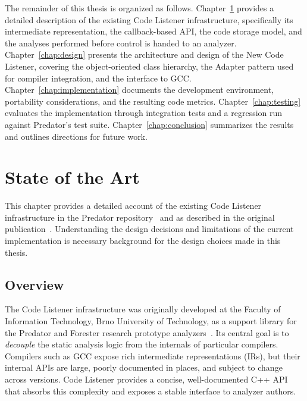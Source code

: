 The remainder of this thesis is organized as follows. Chapter~\ref{chap:sota} provides a detailed description of the existing Code Listener infrastructure, specifically its intermediate representation, the callback-based API, the code storage model, and the analyses performed before control is handed to an analyzer. Chapter~\ref{chap:design} presents the architecture and design of the New Code Listener, covering the object-oriented class hierarchy, the Adapter pattern used for compiler integration, and the interface to GCC. Chapter~\ref{chap:implementation} documents the development environment, portability considerations, and the resulting code metrics. Chapter~\ref{chap:testing} evaluates the implementation through integration tests and a regression run against Predator's test suite. Chapter~\ref{chap:conclusion} summarizes the results and outlines directions for future work.


\chapter{State of the Art}
\label{chap:sota}

This chapter provides a detailed account of the existing Code Listener infrastructure in the Predator repository~\cite{PredatorSuite2016,PredatorHP2020} and as described in the original publication~\cite{CodeListener2012}. Understanding the design decisions and limitations of the current implementation is necessary background for the design choices made in this thesis.

\section{Overview}

The Code Listener infrastructure was originally developed at the Faculty of Information Technology, Brno University of Technology, as a support library for the Predator and Forester research prototype analyzers~\cite{CodeListener2012}. Its central goal is to \emph{decouple} the static analysis logic from the internals of particular compilers. Compilers such as GCC expose rich intermediate representations (IRs), but their internal APIs are large, poorly documented in places, and subject to change across versions. Code Listener provides a concise, well-documented C++ API that absorbs this complexity and exposes a stable interface to analyzer authors.

